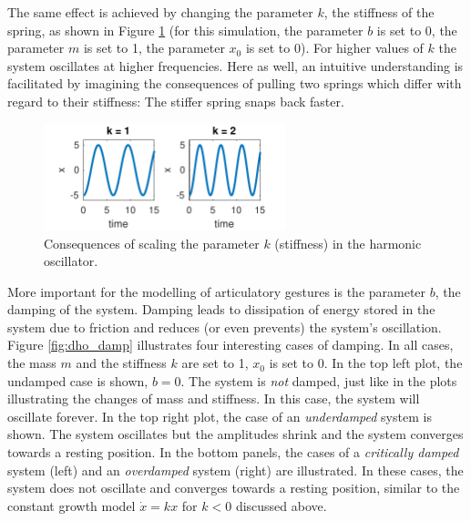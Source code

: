 The same effect is achieved by changing the parameter $k$, the stiffness of the spring, as shown in Figure \ref{fig:dho_stiff} (for this simulation, the parameter $b$ is set to 0, the parameter $m$ is set to 1, the parameter $x_0$ is set to 0). For higher values of $k$ the system oscillates at higher frequencies. Here as well, an intuitive understanding is facilitated by imagining the consequences of pulling two springs which differ with regard to their stiffness: The stiffer spring snaps back faster.

\begin{figure}[htp]
\begin{center}
\includegraphics[width=7cm]{figures/ch3/dho_stiffness.pdf}
\caption{Consequences of scaling the parameter $k$ (stiffness) in the harmonic oscillator.}
\label{fig:dho_stiff}
\end{center}
\end{figure}

More important for the modelling of articulatory gestures is the parameter $b$, the damping of the system. Damping leads to dissipation of energy stored in the system due to friction and reduces (or even prevents) the system’s oscillation. Figure \ref{fig:dho_damp} illustrates four interesting cases of damping. In all cases, the mass $m$ and the stiffness $k$ are set to 1, $x_0$ is set to 0. In the top left plot, the undamped case is shown, $b = 0$. The system is \emph{not} damped, just like in the plots illustrating the changes of mass and stiffness. In this case, the system will oscillate forever. In the top right plot, the case of an \emph{underdamped} system is shown. The system oscillates but the amplitudes shrink and the system converges towards a resting position. In the bottom panels, the cases of a \emph{critically damped} system (left) and an \emph{overdamped} system (right) are illustrated. In these cases, the system does not oscillate and converges towards a resting position, similar to the constant growth model $\dot{x} = kx$ for $k<0$ discussed above.

